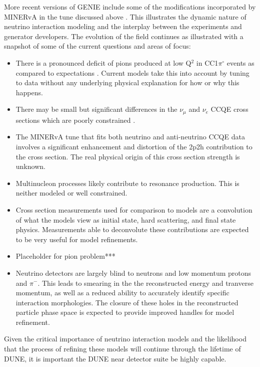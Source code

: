 More recent versions of GENIE include some of the modifications incorporated by MINERvA in the tune discussed above \cite{Alam:2015nkk}.  This illustrates the dynamic nature of neutrino interaction modeling and the interplay between the experiments and generator developers.  The evolution of the field continues as illustrated with a snapshot of some of the current questions and areas of focus:
\begin{itemize}
    \item There is a pronounced deficit of pions produced at low Q$^{2}$ in CC1$\pi^{\circ}$ events as compared to expectations \cite{BercellieNUINT2018,Altinok:2017xua,Aliaga:2015wva,McGivern:2016bwh,novaminosPC}.  Current models take this into account by tuning to data without any underlying physical explanation for how or why this happens.
    \item There may be small but significant differences in the $\nu_{\mu}$ and $\nu_{e}$ CCQE cross sections which are poorly constrained \cite{Day2012gb}.
    \item The MINERvA tune that fits both neutrino and anti-neutrino CCQE data involves a significant enhancement and distortion of the 2p2h contribution to the cross section.  The real physical origin of this cross section strength is unknown.
    \item Multinucleon processes likely contribute to resonance production.  This is neither modeled or well constrained.
    \item Cross section measurements used for comparison to models are a convolution of what the models view as initial state, hard scattering, and final state physics.   Measurements able to deconvolute these contributions are expected to be very useful for model refinements. 
    \item Placeholder for pion problem***
    \item  Neutrino detectors are largely blind to neutrons and low momentum protons and $\pi^{-}$.  This leads to smearing in the the reconstructed energy and tranverse momentum, as well as a reduced ability to accurately identify specific interaction morphologies.  The closure of these holes in the reconstructed particle phase space is expected to provide improved handles for model refinement. 
\end{itemize}
Given the critical importance of neutrino interaction models and the likelihood that the process of refining these models will continue through the lifetime of DUNE, it is important the DUNE near detector suite be highly capable.   

